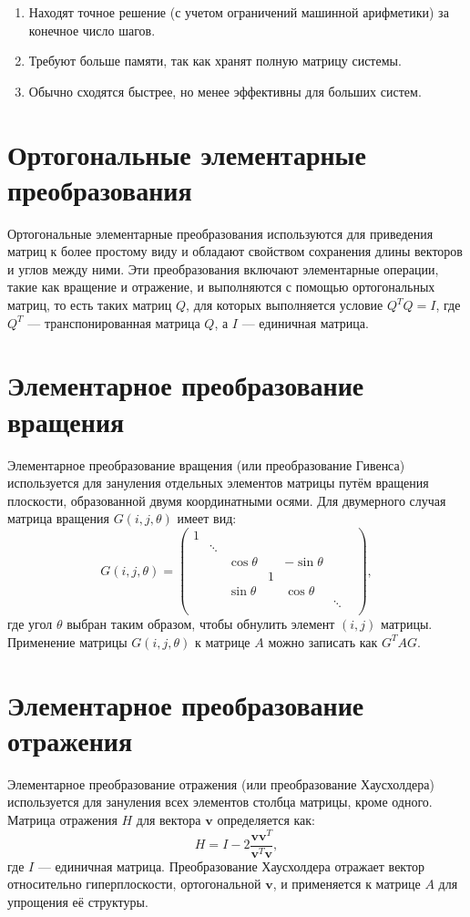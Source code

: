 \documentclass{article}
\begin{document}
\begin{enumerate}
    \item Находят точное решение (с учетом ограничений машинной арифметики) за конечное число шагов.
    \item Требуют больше памяти, так как хранят полную матрицу системы.
    \item Обычно сходятся быстрее, но менее эффективны для больших систем.
\end{enumerate}
\section{Ортогональные элементарные преобразования}
Ортогональные элементарные преобразования используются для приведения матриц к более простому виду и обладают свойством сохранения длины векторов и углов между ними. Эти преобразования включают элементарные операции, такие как вращение и отражение, и выполняются с помощью ортогональных матриц, то есть таких матриц $Q$, для которых выполняется условие $Q^T Q = I$, где $Q^T$ — транспонированная матрица $Q$, а $I$ — единичная матрица.

\section{Элементарное преобразование вращения}
Элементарное преобразование вращения (или преобразование Гивенса) используется для зануления отдельных элементов матрицы путём вращения плоскости, образованной двумя координатными осями. Для двумерного случая матрица вращения $G(i, j, \theta)$ имеет вид:
\[
G(i, j, \theta) = \begin{pmatrix}
1 & & & & & \\
& \ddots & & & & \\
& & \cos \theta & & -\sin \theta & \\
& & & 1 & & \\
& & \sin \theta & & \cos \theta & \\
& & & & & \ddots & \\
\end{pmatrix},
\]
где угол $\theta$ выбран таким образом, чтобы обнулить элемент $(i, j)$ матрицы. Применение матрицы $G(i, j, \theta)$ к матрице $A$ можно записать как $G^T A G$.

\section{Элементарное преобразование отражения}
Элементарное преобразование отражения (или преобразование Хаусхолдера) используется для зануления всех элементов столбца матрицы, кроме одного. Матрица отражения $H$ для вектора $\mathbf{v}$ определяется как:
\[
H = I - 2 \frac{\mathbf{v} \mathbf{v}^T}{\mathbf{v}^T \mathbf{v}},
\]
где $I$ — единичная матрица. Преобразование Хаусхолдера отражает вектор относительно гиперплоскости, ортогональной $\mathbf{v}$, и применяется к матрице $A$ для упрощения её структуры.
\end{document}
